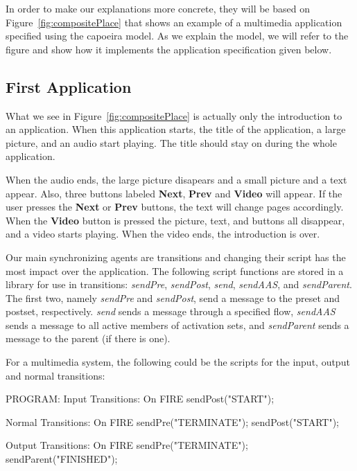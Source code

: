 \documentclass[twocolumn,10pt]{article}
\newcommand{\elmt}[1]{{\bf #1}}
\newenvironment{program}{\verbatim PROGRAM:}{\endverbatim}
\newcommand{\lang}[1]{{\it #1}}
\begin{document}
In order to make our explanations more concrete, they will be based on
Figure~\ref{fig:compositePlace} that shows an example of a multimedia
application specified using the capoeira model.  As we explain the
model, we will refer to the figure and show how it implements the
application specification given below.

\subsection*{First Application}

What we see in Figure~\ref{fig:compositePlace} is actually only the
introduction to an application.  When this application starts, the
title of the application, a large picture, and an audio start playing.
The title should stay on during the whole application.  

When the audio ends, the large picture disapears and a small picture
and a text appear.  Also, three buttons labeled \elmt{Next},
\elmt{Prev} and \elmt{Video} will appear.  If the user presses the
\elmt{Next} or \elmt{Prev} buttons, the text will change pages
accordingly.  When the \elmt{Video} button is pressed the picture,
text, and buttons all disappear, and a video starts playing.  When the
video ends, the introduction is over.

Our main synchronizing agents are transitions and changing their
script has the most impact over the application.  The following script
functions are stored in a library for use in transitions:
\lang{sendPre}, \lang{sendPost}, 
\lang{send}, \lang{sendAAS}, and \lang{sendParent}.  The first two,
namely \lang{sendPre}
and \lang{sendPost}, send a message to the preset and postset,
respectively.  \lang{send} sends a message through a specified flow,
\lang{sendAAS} sends a message to all active members of activation
sets, and \lang{sendParent} sends a message to the parent (if there is
one).

For a multimedia system, the following could be the scripts for the
input, output and normal transitions:

\small

\begin{program}
Input Transitions:           
On FIRE {                    
  sendPost("START");         
}                            
                         
Normal Transitions:     
On FIRE {               
  sendPre("TERMINATE"); 
  sendPost("START");    
}                       

Output Transitions: 
On FIRE {           
  sendPre("TERMINATE"); 
  sendParent("FINISHED");
}                   

\end{program}
\normalsize
\end{document}

